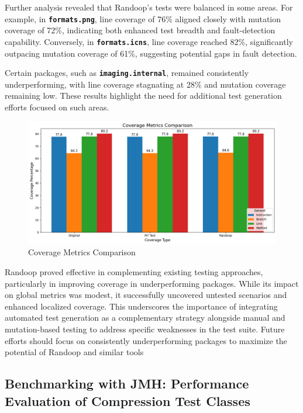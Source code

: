 \documentclass[sigconf]{acmart}
\begin{document}
Further analysis revealed that Randoop’s tests were balanced in some areas. For example, in \textbf{\texttt{formats.png}}, line coverage of 76\% aligned closely with mutation coverage of 72\%, indicating both enhanced test breadth and fault-detection capability. Conversely, in \textbf{\texttt{formats.icns}}, line coverage reached 82\%, significantly outpacing mutation coverage of 61\%, suggesting potential gaps in fault detection.

Certain packages, such as \textbf{\texttt{imaging.internal}}, remained consistently underperforming, with line coverage stagnating at 28\% and mutation coverage remaining low. These results highlight the need for additional test generation efforts focused on such areas.

\begin{figure}[h!]
    \centering
    \includegraphics[width=1\linewidth]{Coverage_Metrics_Comparison.png}
    \caption{Coverage Metrics Comparison}
    \label{fig:enter-label}
\end{figure}

Randoop proved effective in complementing existing testing approaches, particularly in improving coverage in underperforming packages. While its impact on global metrics was modest, it successfully uncovered untested scenarios and enhanced localized coverage. This underscores the importance of integrating automated test generation as a complementary strategy alongside manual and mutation-based testing to address specific weaknesses in the test suite. Future efforts should focus on consistently underperforming packages to maximize the potential of Randoop and similar tools


\subsection{Benchmarking with JMH: Performance Evaluation of Compression Test Classes}
\end{document}
